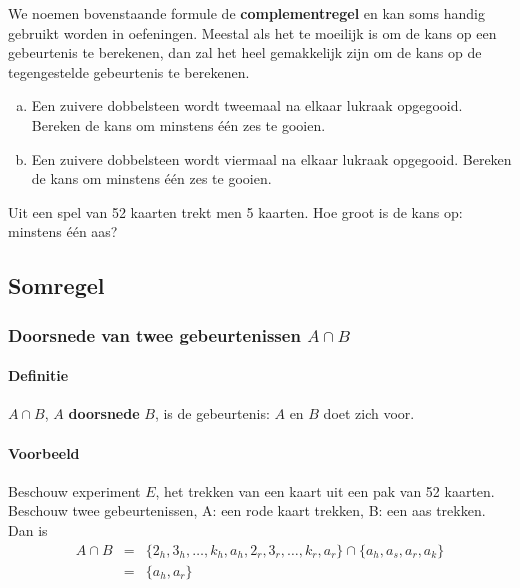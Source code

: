 \documentclass[12pt,a4paper,twoside]{article}
\begin{document}
We noemen bovenstaande formule de {\bf complementregel} en kan soms handig gebruikt worden in oefeningen. Meestal als het te moeilijk is om de kans op een gebeurtenis te berekenen, dan zal het heel gemakkelijk zijn om de kans op de tegengestelde gebeurtenis te berekenen.

\begin{oefening}
  \begin{enumerate}[(a)]
  \item Een zuivere dobbelsteen wordt tweemaal na elkaar lukraak opgegooid. Bereken de kans om minstens één zes te gooien.
  \item Een zuivere dobbelsteen wordt viermaal na elkaar lukraak opgegooid. Bereken de kans om minstens één zes te gooien.
  \end{enumerate}
\end{oefening}

\begin{oefening}
Uit een spel van 52 kaarten trekt men 5 kaarten. Hoe groot is de kans op: minstens één aas?
\end{oefening}

\subsection{Somregel}

\subsubsection{Doorsnede van twee gebeurtenissen $A\cap B$}

\paragraph*{Definitie}
$A\cap B$, $A$ {\bf doorsnede} $B$, is de gebeurtenis: $A$ en $B$ doet zich voor.

\paragraph*{Voorbeeld}
Beschouw experiment $E$, het trekken van een kaart uit een pak van 52 kaarten. Beschouw twee gebeurtenissen, A: een rode kaart trekken, B: een aas trekken. Dan is\\
\begin{eqnarray*}
A\cap B &=& \{2_h, 3_h, \ldots, k_h, a_h, 2_r, 3_r, \ldots, k_r, a_r\}\cap\{a_h, a_s, a_r, a_k\}\\
        &=& \{a_h, a_r\}
\end{eqnarray*}
\end{document}
